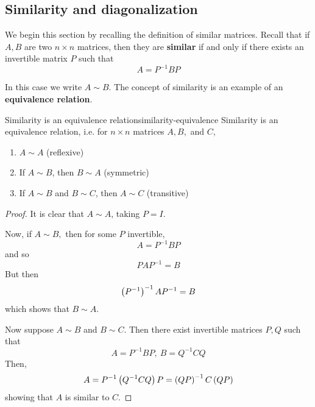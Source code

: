 \subsection{Similarity and diagonalization}

We begin this section by recalling the definition  of similar matrices. 
Recall that if $A,B$ are two $n\times n$ matrices, then they are \textbf{similar}
if and only if there exists an invertible matrix $P$
such that
\begin{equation*}
A=P^{-1}BP
\end{equation*}

In this case we write $A \sim B$. The concept of similarity is an example of an \textbf{equivalence relation}.

\begin{lemma}{Similarity is an equivalence relation}{similarity-equivalence}
Similarity is an equivalence relation, i.e. for $n \times n$ matrices $A,B,$ and $C$, 
\begin{enumerate}
\item $A \sim A$ (reflexive)
\item If $A \sim B$, then $B \sim A$ (symmetric)
\item If $A \sim B$ and $B \sim C$, then $A \sim C$ (transitive)
\end{enumerate}
\end{lemma}

\begin{proof}
It is clear that $A\sim A$, taking $P=I$. 

Now, if $A\sim B,$ then for some $P$ invertible,
\begin{equation*}
A=P^{-1}BP
\end{equation*}
and so
\begin{equation*}
PAP^{-1}=B
\end{equation*}
But then
\begin{equation*}
\left(P^{-1}\right) ^{-1}AP^{-1}=B
\end{equation*}
which shows that $B\sim A$.

Now suppose $A\sim B$ and $B\sim C$. Then there exist invertible matrices 
$P,Q$ such that
\begin{equation*}
A=P^{-1}BP,\ B=Q^{-1}CQ
\end{equation*}
Then,
\begin{equation*}
A=P^{-1} \left(Q^{-1}CQ \right)P=\left(QP\right) ^{-1}C\left(QP\right)
\end{equation*}
showing that $A$ is similar to $C$.
\end{proof}

